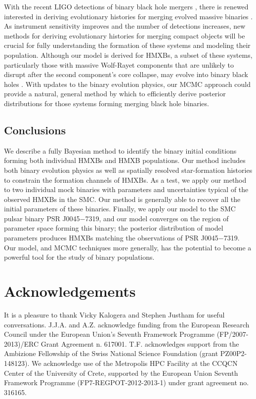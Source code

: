 \documentclass[usenatbib]{mnras}
\begin{document}
With the recent LIGO detections of binary black hole mergers \citep{abbott16a,abbott16b}, there is renewed interested in deriving evolutionary histories for merging evolved massive binaries \citep{belczynski16}. As instrument sensitivity improves and the number of detections increases, new methods for deriving evolutionary histories for merging compact objects will be crucial for fully understanding the formation of these systems and modeling their population. Although our model is derived for HMXBs, a subset of these systems, particularly those with massive Wolf-Rayet components that are unlikely to disrupt after the second component's core collapse, may evolve into binary black holes \citep{belczynski13,maccarone14}. With updates to the binary evolution physics, our MCMC approach could provide a natural, general method by which to efficiently derive posterior distributions for those systems forming merging black hole binaries. 



\subsection{Conclusions}
\label{sec:conclusions}


We describe a fully Bayesian method to identify the binary initial conditions forming both individual HMXBs and HMXB populations. Our method includes both binary evolution physics as well as spatially resolved star-formation histories to constrain the formation channels of HMXBs. As a test, we apply our method to two individual mock binaries with parameters and uncertainties typical of the observed HMXBs in the SMC. Our method is generally able to recover all the initial parameters of these binaries. Finally, we apply our model to the SMC pulsar binary PSR J0045$-$7319, and our model converges on the region of parameter space forming this binary; the posterior distribution of model parameters produces HMXBs matching the observations of PSR J0045$-$7319. Our model, and MCMC techniques more generally, has the potential to become a powerful tool for the study of binary populations.







\section*{Acknowledgements}
It is a pleasure to thank Vicky Kalogera and Stephen Justham for useful conversations. J.J.A. and A.Z. acknowledge funding from the European Research Council under the European Union's Seventh Framework Programme (FP/2007-2013)/ERC Grant Agreement n. 617001. T.F. acknowledges support from the Ambizione Fellowship of the Swiss National Science Foundation (grant PZ00P2-148123). We acknowledge use of the Metropolis HPC Facility at the CCQCN Center of the University of Crete, supported by the European Union Seventh Framework Programme (FP7-REGPOT-2012-2013-1) under grant agreement no. 316165.
\end{document}
